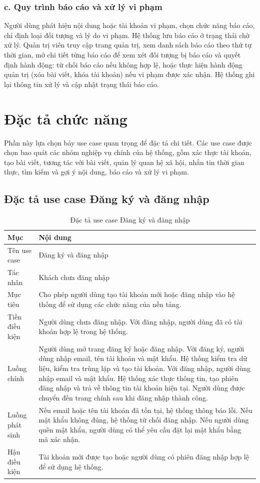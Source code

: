 \documentclass[../DoAn.tex]{subfiles}
\begin{document}
\subsubsection*{c. Quy trình báo cáo và xử lý vi phạm}
Người dùng phát hiện nội dung hoặc tài khoản vi phạm, chọn chức năng báo cáo, chỉ định loại đối tượng và lý do vi phạm. Hệ thống lưu báo cáo ở trạng thái chờ xử lý. Quản trị viên truy cập trang quản trị, xem danh sách báo cáo theo thứ tự thời gian, mở chi tiết từng báo cáo để xem xét đối tượng bị báo cáo và quyết định hành động: từ chối báo cáo nếu không hợp lệ, hoặc thực hiện hành động quản trị (xóa bài viết, khóa tài khoản) nếu vi phạm được xác nhận. Hệ thống ghi lại thông tin xử lý và cập nhật trạng thái báo cáo.

\section{Đặc tả chức năng}
\label{section:2.3}
Phần này lựa chọn bảy use case quan trọng để đặc tả chi tiết. Các use case được chọn bao quát các nhóm nghiệp vụ chính của hệ thống, gồm xác thực tài khoản, tạo bài viết, tương tác với bài viết, quản lý quan hệ xã hội, nhắn tin thời gian thực, tìm kiếm và gợi ý nội dung, báo cáo và xử lý vi phạm.

\subsection{Đặc tả use case Đăng ký và đăng nhập}
\label{subsection:2.3.1}
\begin{table}[H]
\centering
\caption{Đặc tả use case Đăng ký và đăng nhập}
\label{table:uc-auth}
\begin{tabular}{|p{3.5cm}|p{9.5cm}|}
\hline
\textbf{Mục} & \textbf{Nội dung} \\
\hline
Tên use case & Đăng ký và đăng nhập \\
\hline
Tác nhân & Khách chưa đăng nhập \\
\hline
Mục tiêu & Cho phép người dùng tạo tài khoản mới hoặc đăng nhập vào hệ thống để sử dụng các chức năng của nền tảng. \\
\hline
Tiền điều kiện & Người dùng chưa đăng nhập. Với đăng nhập, người dùng đã có tài khoản hợp lệ trong hệ thống. \\
\hline
Luồng chính & Người dùng mở trang đăng ký hoặc đăng nhập. Với đăng ký, người dùng nhập email, tên tài khoản và mật khẩu. Hệ thống kiểm tra dữ liệu, kiểm tra trùng lặp và tạo tài khoản. Với đăng nhập, người dùng nhập email và mật khẩu. Hệ thống xác thực thông tin, tạo phiên đăng nhập và trả về thông tin tài khoản hiện tại. Người dùng được chuyển đến trang chính sau khi đăng nhập thành công. \\
\hline
Luồng phát sinh & Nếu email hoặc tên tài khoản đã tồn tại, hệ thống thông báo lỗi. Nếu mật khẩu không đúng, hệ thống từ chối đăng nhập. Nếu người dùng quên mật khẩu, người dùng có thể yêu cầu đặt lại mật khẩu bằng mã xác nhận. \\
\hline
Hậu điều kiện & Tài khoản mới được tạo hoặc người dùng có phiên đăng nhập hợp lệ để sử dụng hệ thống. \\
\hline
\end{tabular}
\end{table}
\end{document}
